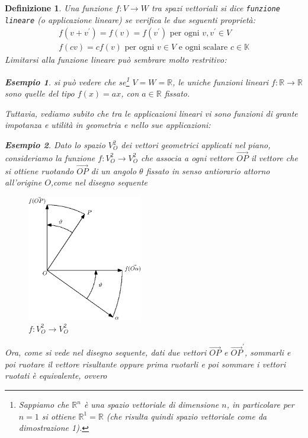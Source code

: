 \message{ !name(algebraegeometria.tex)}\documentclass{book}
\newtheorem{definizione}{Definizione}
\newtheorem{esempio}{Esempio}
\begin{document}
\begin{definizione}
  Una funzione $f:V\to W$ tra spazi vettoriali si dice \texttt{funzione lineare} (o \textit{applicazione
    lineare}) se verifica le due seguenti proprietà:
  \begin{eqnarray}
    \label{4.1-4.2}
    f(v+v^{\prime})=f(v)=f(v^\prime) \text{ per ogni } v,v^\prime \in V\\
    f(cv)=cf(v) \text{ per ogni } v\in V\text{ e ogni scalare }c \in \mathds{K}
  \end{eqnarray}
  Limitarsi alla funzione lineare può sembrare molto restritivo:
  \begin{esempio}
    si può vedere che se\footnote{Sappiamo che $\mathds{R}^n$ è una spazio vettoriale di dimensione $n$, in
      particolare per $n=1$ si ottiene $\mathds{R}^1=\mathds{R}$ (che risulta quindi spazio vettoriale come da
      dimostrazione 1).}  $V=W=\mathds{R}$, le uniche funzioni lineari $f:\mathds{R}\to\mathds{R}$ sono quelle
    del tipo $f(x)=ax$, con $a\in \mathds{R}$ fissato.
  \end{esempio}
  Tuttavia, vediamo subito che tra le applicazioni lineari vi sono funzioni di grante impotanza e utilità in
  geometria e nello sue applicazioni:
  \begin{esempio}
    Dato lo spazio $V_O^2$ dei vettori geometrici applicati nel piano, consideriamo la funzione
    $f:V_O^2\to V_O^2$ che associa a ogni vettore $\vec{OP}$ il vettore che si ottiene ruotando $\vec{OP}$ di
    un angolo $\theta$ fissato in senso antiorario attorno all'origine $O$,come nel disegno sequente 
    \begin{figure}[th]
      \centering
        \includegraphics[width=5cm]{img/finiti/imgex4-2-1.eps}
      \caption{$f:V_O^2\to V_O^2$}
    \end{figure}
    Ora, come si vede nel disegno sequente, dati due vettori $\vec{OP}$ e $\vec{OP}^\prime$, sommarli e poi
    ruotare il vettore risultante oppure prima ruotarli e poi sommare i vettori ruotati è equivalente, ovvero

\end{esempio}
\end{definizione}
\end{document}
